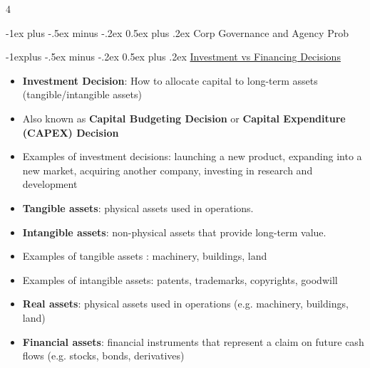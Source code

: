 \documentclass[10pt, landscape]{article}
\makeatletter
\renewcommand{\section}{\@startsection{section}{1}{0mm}%
  {-1ex plus -.5ex minus -.2ex}%
  {0.5ex plus .2ex}%
{\normalfont\large\bfseries}}
\renewcommand{\subsection}{\@startsection{subsection}{2}{0mm}%
  {-1explus -.5ex minus -.2ex}%
  {0.5ex plus .2ex}%
{\normalfont\normalsize\bfseries}}
\makeatother
\begin{document}
\raggedright
\footnotesize
\begin{multicols*}{4}
  \setlength{\columnseprule}{0.25pt}

  \begin{center}
  \end{center}

  \section{Corp Governance and Agency Prob}

  \subsection{\underline{Investment vs Financing Decisions}}

  \begin{itemize}
    \item \textbf{Investment Decision}: How to allocate capital to long-term assets (tangible/intangible assets)
    \item Also known as \textbf{Capital Budgeting Decision} or \textbf{Capital Expenditure (CAPEX) Decision}
    \item Examples of investment decisions: launching a new product, expanding into a new market, acquiring another company, investing in research and development
    \item \textbf{Tangible assets}: physical assets used in operations.
    \item \textbf{Intangible assets}: non-physical assets that provide long-term value.
    \item Examples of tangible assets : machinery, buildings, land
    \item Examples of intangible assets: patents, trademarks, copyrights, goodwill
    \item \textbf{Real assets}: physical assets used in operations (e.g. machinery, buildings, land)
    \item \textbf{Financial assets}: financial instruments that represent a claim on future cash flows (e.g. stocks, bonds, derivatives)
  \end{itemize}


\end{multicols*}
\end{document}
